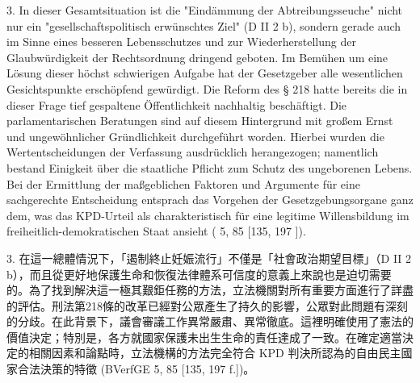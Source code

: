 \documentclass[12pt]{article}
\begin{document}
\syncleft
\begin{sourcepara}
3. In dieser Gesamtsituation ist die "Eindämmung der Abtreibungsseuche" nicht nur ein "gesellschaftspolitisch erwünschtes Ziel" (D II 2 b), sondern gerade auch im Sinne eines besseren Lebensschutzes und zur Wiederherstellung der Glaubwürdigkeit der Rechtsordnung dringend geboten. Im Bemühen um eine Lösung dieser höchst schwierigen Aufgabe hat der Gesetzgeber alle wesentlichen Gesichtspunkte erschöpfend gewürdigt. Die Reform des § 218 \abbrStGB{} hatte bereits die in dieser Frage tief gespaltene Öffentlichkeit nachhaltig beschäftigt. Die parlamentarischen Beratungen sind auf diesem Hintergrund mit großem Ernst und ungewöhnlicher Gründlichkeit durchgeführt worden. Hierbei wurden die Wertentscheidungen der Verfassung ausdrücklich herangezogen; namentlich bestand Einigkeit über die staatliche Pflicht zum Schutz des ungeborenen Lebens. Bei der Ermittlung der maßgeblichen Faktoren und Argumente für eine sachgerechte Entscheidung entsprach das Vorgehen der Gesetzgebungsorgane ganz dem, was das KPD-Urteil als charakteristisch für eine legitime Willensbildung im freiheitlich-demokratischen Staat ansieht (\abbrBVerfGE{} 5, 85 [135, 197 \abbrF{}]).
\end{sourcepara}
\begin{transpara}
3. 在這一總體情況下，「遏制終止妊娠流行」不僅是「社會政治期望目標」（D II 2 b），而且從更好地保護生命和恢復法律體系可信度的意義上來說也是迫切需要的。為了找到解決這一極其艱鉅任務的方法，立法機關對所有重要方面進行了詳盡的評估。刑法第218條的改革已經對公眾產生了持久的影響，公眾對此問題有深刻的分歧。在此背景下，議會審議工作異常嚴肅、異常徹底。這裡明確使用了憲法的價值決定；特別是，各方就國家保護未出生生命的責任達成了一致。在確定適當決定的相關因素和論點時，立法機構的方法完全符合 KPD 判決所認為的自由民主國家合法決策的特徵 (BVerfGE 5, 85 [135, 197 f.])。
\end{transpara}
\end{document}
